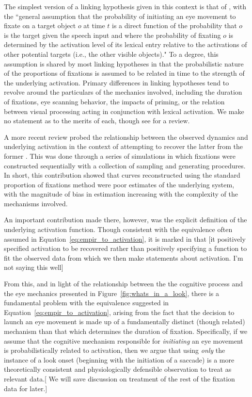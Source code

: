 The simplest version of a linking hypothesis given in this context is that of \cite{allopenna1998tracking}, with  the ``general assumption that the probability of initiating an eye movement to fixate on a target object $o$ at time $t$ is a direct function of the probability that $o$ is the target given the speech input and where the probability of fixating $o$ is determined by the activation level of its lexical entry relative to the activations of other potential targets (i.e., the other visible objects)." To a degree, this assumption is shared by most linking hypotheses in that the probabilistic nature of the proportions of fixations is assumed to be related in time to the strength of the underlying activation. Primary differences in linking hypotheses tend to revolve around the particulars of the mechanics involved, including the duration of fixations, eye scanning behavior, the impacts of priming, or the relation between visual  processing acting in conjunction with lexical activation. We make no statement as to the merits of each, though see \cite{Magnuson2019} for a review.

A more recent review probed the relationship between the observed dynamics and underlying activation in the context of attempting to recover the latter from the former \cite{mcmurray2022m}. This was done through a series of simulations in which fixations were constructed sequentially with a collection of sampling and generating procedures. In short, this contribution showed that curves reconstructed using the standard proportion of fixations method were poor estimates of the underlying system, with the magnitude of bias in estimation increasing with the complexity of the mechanisms involved.

An important contribution made there, however, was the explicit definition of the underlying activation function. Though consistent with the equivalence often assumed in Equation~\ref{eq:empir_to_activation}, it is marked in that [it positively specified activation to be recovered rather than positively specifying a function to fit the observed data from which we then make statements about activation. I'm not saying this well]

From this, and in light of the relationship between the the cognitive process and the eye mechanics presented in Figure~\ref{fig:whats_in_a_look}, there is a fundamental problem with the equivalence suggested in Equation~\ref{eq:empir_to_activation}, arising from the fact that the decision to launch an eye movement is made up of a fundamentally distinct (though related) mechanism than that which determines the duration of fixation. Specifically, if we assume that the cognitive mechanism responsible for \textit{initiating} an eye movement is probabilistically related to activation, then we argue that using \textit{only} the instance of a look onset (beginning with the initiation of a saccade) is a more theoretically consistent and physiologically defensible observation to treat as relevant data.[ We will save discussion on treatment of the rest of the fixation data for later.]


